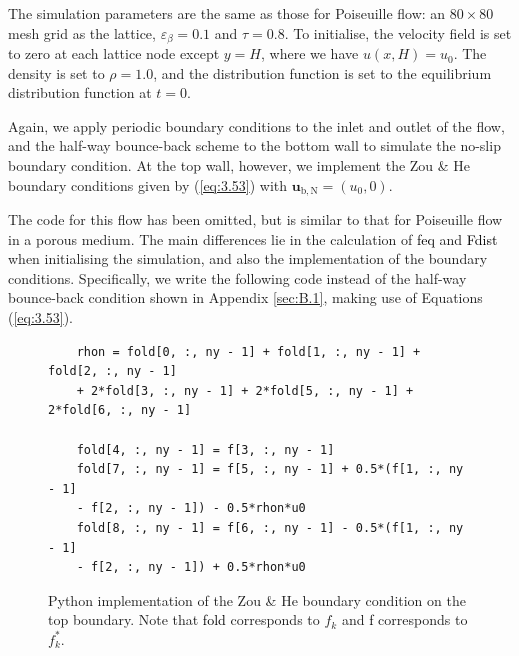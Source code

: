 \documentclass[a4paper, 11pt]{report}
\begin{document}
The simulation parameters are the same as those for Poiseuille flow: an $80\times80$ mesh grid as the lattice, $\varepsilon_\beta=0.1$ and $\tau=0.8$. To initialise, the velocity field is set to zero at each lattice node except $y=H$, where we have $u(x,H)=u_0$. The density is set to $\rho=1.0$, and the distribution function is set to the equilibrium distribution function at $t=0$. 
 
Again, we apply periodic boundary conditions to the inlet and outlet of the flow, and the half-way bounce-back scheme to the bottom wall to simulate the no-slip boundary condition. At the top wall, however, we implement the Zou \& He boundary conditions given by (\ref{eq:3.53}) with $\mathbf{u}_{\mathrm{b,N}}=(u_0,0)$.

The code for this flow has been omitted, but is similar to that for Poiseuille flow in a porous medium. The main differences lie in the calculation of {\selectfont\textcolor{black}{feq}} and {\selectfont\textcolor{black}{Fdist}} when initialising the simulation, and also the implementation of the boundary conditions. Specifically, we write the following code instead of the half-way bounce-back condition shown in Appendix \ref{sec:B.1}, making use of Equations (\ref{eq:3.53}).
\begin{figure}[!htb]{\small
\begin{mdframed}[backgroundcolor=red!10, linecolor=red!10]
\begin{verbatim}
    rhon = fold[0, :, ny - 1] + fold[1, :, ny - 1] + fold[2, :, ny - 1] 
    + 2*fold[3, :, ny - 1] + 2*fold[5, :, ny - 1] + 2*fold[6, :, ny - 1]

    fold[4, :, ny - 1] = f[3, :, ny - 1]
    fold[7, :, ny - 1] = f[5, :, ny - 1] + 0.5*(f[1, :, ny - 1] 
    - f[2, :, ny - 1]) - 0.5*rhon*u0 
    fold[8, :, ny - 1] = f[6, :, ny - 1] - 0.5*(f[1, :, ny - 1] 
    - f[2, :, ny - 1]) + 0.5*rhon*u0
\end{verbatim}
\end{mdframed}
}
\caption[Python implementation of the Zou \& He boundary condition on the top boundary]{Python implementation of the Zou \& He boundary condition on the top boundary. Note that {\selectfont\textcolor{black}{fold}} corresponds to $f_k$ and {\selectfont\textcolor{black}{f}} corresponds to $f_k^*$.}
\end{figure}
\end{document}
